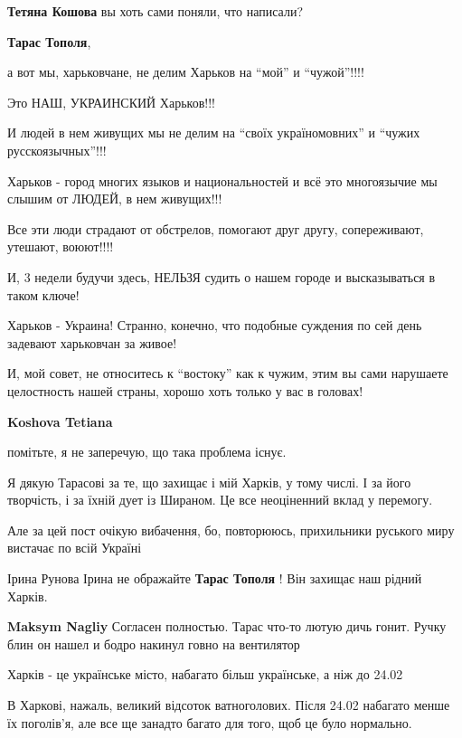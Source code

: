 \begin{itemize}
\begin{itemize}
\textbf{Тетяна Кошова} вы хоть сами поняли, что написали?

\textbf{Тарас Тополя}, 

а вот мы, харьковчане, не делим Харьков на \enquote{мой} и \enquote{чужой}!!!!

Это НАШ, УКРАИНСКИЙ Харьков!!!

И людей в нем живущих мы не делим на \enquote{своїх україномовних} и
\enquote{чужих русскоязычных}!!!

Харьков - город многих языков и национальностей и всё это многоязычие мы слышим
от ЛЮДЕЙ, в нем живущих!!!

Все эти люди страдают от обстрелов, помогают друг другу, сопереживают, утешают,
воюют!!!!

И, 3 недели будучи здесь, НЕЛЬЗЯ судить о нашем городе и высказываться в таком
ключе!

Харьков - Украина! Странно, конечно, что подобные суждения по сей день задевают
харьковчан за живое!

И, мой совет, не относитесь к \enquote{востоку} как к чужим, этим вы сами
нарушаете целостность нашей страны, хорошо хоть только у вас в головах!

\textbf{Koshova Tetiana} 

помітьте, я не заперечую, що така проблема існує.

Я дякую Тарасові за те, що захищає і мій Харків, у тому числі. І за його
творчість, і за їхній дует із Шираном. Це все неоціненний вклад у перемогу.

Але за цей пост очікую вибачення, бо, повторююсь, прихильники руського миру
вистачає по всій Україні

Ірина Рунова Ірина не ображайте \textbf{Тарас Тополя} ! Він захищає наш рідний Харків.

\textbf{Maksym Nagliy} Согласен полностью. Тарас что-то лютую дичь гонит. Ручку блин он нашел и бодро накинул говно на вентилятор

\end{itemize} %


Харків - це українське місто, набагато більш українське, а ніж до 24.02

В Харкові, нажаль, великий відсоток ватноголових. Після 24.02 набагато менше їх
поголів'я, але все ще занадто багато для того, щоб це було нормально.


\end{itemize}
